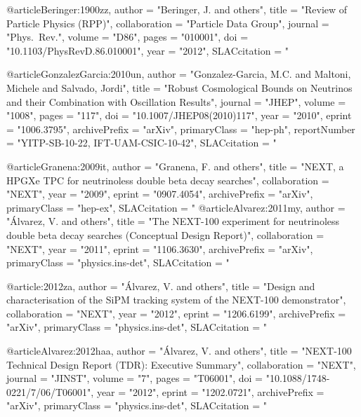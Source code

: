 {{@article{Beringer:1900zz,
      author         = "Beringer, J. and others",
      title          = "{Review of Particle Physics (RPP)}",
      collaboration  = "Particle Data Group",
      journal        = "Phys.\ Rev.",
      volume         = "D86",
      pages          = "010001",
      doi            = "10.1103/PhysRevD.86.010001",
      year           = "2012",
      SLACcitation   = "%
}

@article{GonzalezGarcia:2010un,
      author         = "Gonzalez-Garcia, M.C. and Maltoni, Michele and Salvado,
                        Jordi",
      title          = "{Robust Cosmological Bounds on Neutrinos and their
                        Combination with Oscillation Results}",
      journal        = "JHEP",
      volume         = "1008",
      pages          = "117",
      doi            = "10.1007/JHEP08(2010)117",
      year           = "2010",
      eprint         = "1006.3795",
      archivePrefix  = "arXiv",
      primaryClass   = "hep-ph",
      reportNumber   = "YITP-SB-10-22, IFT-UAM-CSIC-10-42",
      SLACcitation   = "%
}

@article{Granena:2009it,
      author         = "Granena, F. and others",
      title          = "{NEXT, a HPGXe TPC for neutrinoless double beta decay
                        searches}",
      collaboration  = "NEXT",
      year           = "2009",
      eprint         = "0907.4054",
      archivePrefix  = "arXiv",
      primaryClass   = "hep-ex",
      SLACcitation   = "%
}
@article{Alvarez:2011my,
      author         = "\'Alvarez, V. and others",
      title          = "{The NEXT-100 experiment for neutrinoless double beta
                        decay searches (Conceptual Design Report)}",
      collaboration  = "NEXT",
      year           = "2011",
      eprint         = "1106.3630",
      archivePrefix  = "arXiv",
      primaryClass   = "physics.ins-det",
      SLACcitation   = "%
}

@article{:2012za,
      author         = "\'Alvarez, V. and others",
      title          = "{Design and characterisation of the SiPM tracking system
                        of the NEXT-100 demonstrator}",
      collaboration  = "NEXT",
      year           = "2012",
      eprint         = "1206.6199",
      archivePrefix  = "arXiv",
      primaryClass   = "physics.ins-det",
      SLACcitation   = "%
}

@article{Alvarez:2012haa,
      author         = "\'Alvarez, V. and others",
      title          = "{NEXT-100 Technical Design Report (TDR): Executive
                        Summary}",
      collaboration  = "NEXT",
      journal        = "JINST",
      volume         = "7",
      pages          = "T06001",
      doi            = "10.1088/1748-0221/7/06/T06001",
      year           = "2012",
      eprint         = "1202.0721",
      archivePrefix  = "arXiv",
      primaryClass   = "physics.ins-det",
      SLACcitation   = "%
}

}}
